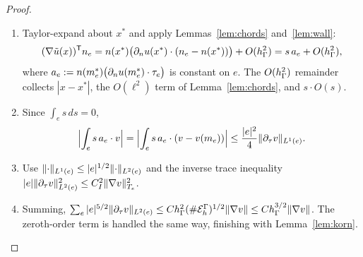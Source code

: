 \begin{proof}
\begin{enumerate}
\item Taylor-expand about $x^\ast$ and apply Lemmas~\ref{lem:chords} and~\ref{lem:wall}:
\[
(\nabla\tilde u(x))^{\mathsf T}n_e=n(x^\ast)\bigl(\partial_n u(x^\ast)\cdot(n_e-n(x^\ast))\bigr)+O(h_\Gamma^2)=s\,a_e+O(h_\Gamma^2),
\]
where $a_e:=n(m_e^\ast)\bigl(\partial_n u(m_e^\ast)\cdot\tau_e\bigr)$ is constant on $e$. The $O(h_\Gamma^2)$ remainder collects $|x-x^\ast|$, the $O(\ell^2)$ term of Lemma~\ref{lem:chords}, and $s\cdot O(s)$.
\item Since $\int_e s\,ds=0$,
\[
\Bigl|\int_e s\,a_e\cdot v\Bigr|=\Bigl|\int_e s\,a_e\cdot(v-v(m_e))\Bigr|\le\frac{|e|^2}{4}\lVert \partial_\tau v\rVert_{L^1(e)} .
\]
\item Use $\lVert \cdot\rVert_{L^1(e)}\le|e|^{1/2}\lVert \cdot\rVert_{L^2(e)}$ and the inverse trace inequality $|e|\lVert \partial_\tau v\rVert^2_{L^2(e)}\le C_I^2\lVert \nabla v\rVert^2_{T_e}$.
\item Summing, $\sum_e|e|^{5/2}\lVert \partial_\tau v\rVert_{L^2(e)}\le Ch_\Gamma^2(\#\mathcal E_h^\Gamma)^{1/2}\lVert \nabla v\rVert\le Ch_\Gamma^{3/2}\lVert \nabla v\rVert$. The zeroth-order term is handled the same way, finishing with Lemma~\ref{lem:korn}.\qedhere
\end{enumerate}
\end{proof}
